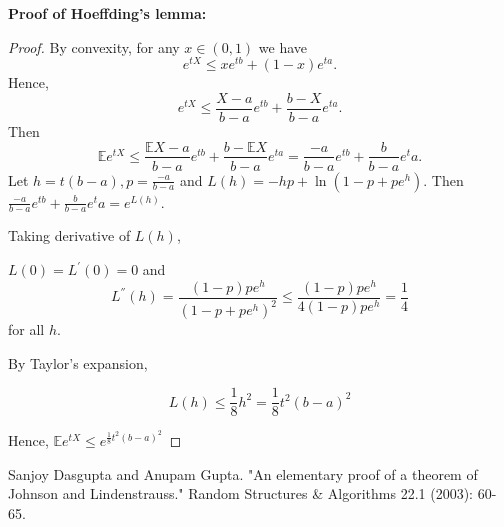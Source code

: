 \documentclass[11pt]{article}
\theoremstyle{definition}
\newcommand\EE{\mathbb{E}}
\begin{document}
\noindent\textbf{Proof of Hoeffding's lemma:}
\begin{proof}
By convexity, for any $x\in(0,1)$ we have 
$$e^{tX}\leq xe^{tb}+(1-x)e^{ta}.$$
Hence,
$$e^{tX}\leq \frac{X-a}{b-a}e^{tb}+\frac{b-X}{b-a}e^{ta}.$$
Then
$$\EE e^{tX}\leq \frac{\EE X-a}{b-a}e^{tb}+\frac{b-\EE X}{b-a}e^{ta}=\frac{-a}{b-a}e^{tb}+\frac{b}{b-a}e^ta.$$
Let $\displaystyle h=t(b-a), \displaystyle p={\frac {-a}{b-a}}$ and $\displaystyle L(h)=-hp+\ln(1-p+pe^{h})$. Then $\frac{-a}{b-a}e^{tb}+\frac{b}{b-a}e^ta=e^{L(h)}$.

Taking derivative of $\displaystyle L(h)$, 

$\displaystyle L(0)=L^{'}(0)=0$  and 
$$L^{''}(h)=\frac{(1-p)pe^h}{(1-p+pe^h)^2}\leq \frac{(1-p)pe^h}{4(1-p)pe^h}=\frac {1}{4}$$
 for all $h$.

By Taylor's expansion,

$$\displaystyle L(h)\leq \frac {1}{8}h^{2}=\frac {1}{8}t^{2}(b-a)^{2}$$

Hence, $\displaystyle \mathbb {E} e^{t X}\leq e^{{\frac {1}{8}}t^{2}(b-a)^{2}}$
\end{proof}










\begin{thebibliography}{[AHU]}
 Sanjoy Dasgupta and Anupam Gupta. "An elementary proof of a theorem of Johnson and Lindenstrauss." Random Structures \& Algorithms 22.1 (2003): 60-65.
\end{thebibliography}
\end{document}
